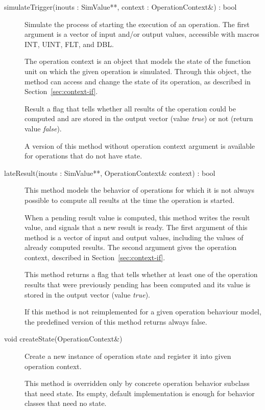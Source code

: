 \documentclass[a4paper,twoside]{tce}
\begin{document}
\begin{description}
\item[simulateTrigger(inouts : SimValue**, context : OperationContext\&) :
  bool] %
  Simulate the process of starting the execution of an operation. The first
  argument is a vector of input and/or output values, accessible with macros
  INT, UINT, FLT, and DBL.

  The operation context is an object that models the state of the function
  unit on which the given operation is simulated. Through this object, the
  method can access and change the state of its operation, as described in
  Section~\ref{sec:context-if}.

  Result a flag that tells whether all results of the operation could be
  computed and are stored in the output vector (value \emph{true}) or not
  (return value \emph{false}).

  A version of this method without operation context argument is available
  for operations that do not have state.

\item[lateResult(inouts : SimValue**, OperationContext\& context) : bool] %

  This method models the behavior of operations for which it is not always
  possible to compute all results at the time the operation is started.

  When a pending result value is computed, this method writes the result
  value, and signals that a new result is ready. The first argument of this
  method is a vector of input and output values, including the values of
  already computed results. The second argument gives the operation context,
  described in Section~\ref{sec:context-if}.

  This method returns a flag that tells whether at least one of the
  operation results that were previously pending has been computed and its
  value is stored in the output vector (value \emph{true}).

  If this method is not reimplemented for a given operation behaviour model,
  the predefined version of this method returns always false.

\item[void createState(OperationContext\&)]%
  Create a new instance of operation state and register it into given
  operation context.

  This method is overridden only by concrete operation behavior subclass
  that need state.  Its empty, default implementation is enough for behavior
  classes that need no state.


\end{description}
\end{document}
